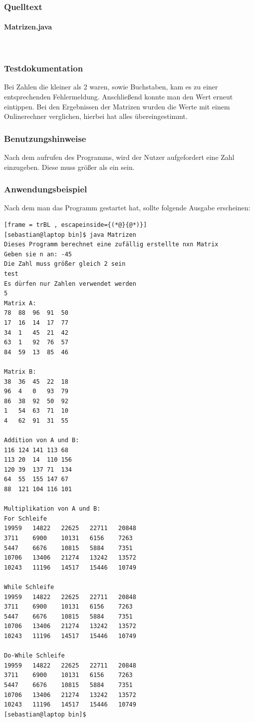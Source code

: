 \subsubsection{Quelltext}
\paragraph{Matrizen.java}\


\subsubsection{Testdokumentation}
Bei Zahlen die kleiner als 2 waren, sowie Buchstaben, kam es zu einer entsprechenden Fehlermeldung. Anschlie\ss end konnte man den Wert erneut eintippen.
Bei den Ergebnissen der Matrizen wurden die Werte mit einem Onlinerechner verglichen, hierbei hat
alles übereingestimmt.

\subsubsection{Benutzungshinweise}
Nach dem aufrufen des Programms, wird der Nutzer aufgefordert eine Zahl einzugeben.
Diese muss grö\ss er als ein sein.

\subsubsection{Anwendungsbeispiel}
Nach dem man das Programm gestartet hat, sollte folgende Ausgabe erscheinen:
\begin{lstlisting}[frame = trBL , escapeinside={(*@}{@*)}]
[sebastian@laptop bin]$ java Matrizen 
Dieses Programm berechnet eine zufällig erstellte nxn Matrix
Geben sie n an: -45
Die Zahl muss größer gleich 2 sein
test
Es dürfen nur Zahlen verwendet werden
5
Matrix A:
78	88	96	91	50	
17	16	14	17	77	
34	1	45	21	42	
63	1	92	76	57	
84	59	13	85	46	

Matrix B:
38	36	45	22	18	
96	4	0	93	79	
86	38	92	50	92	
1	54	63	71	10	
4	62	91	31	55	

Addition von A und B:
116	124	141	113	68	
113	20	14	110	156	
120	39	137	71	134	
64	55	155	147	67	
88	121	104	116	101	

Multiplikation von A und B:
For Schleife
19959	14822	22625	22711	20848	
3711	6900	10131	6156	7263	
5447	6676	10815	5884	7351	
10706	13406	21274	13242	13572	
10243	11196	14517	15446	10749	

While Schleife
19959	14822	22625	22711	20848	
3711	6900	10131	6156	7263	
5447	6676	10815	5884	7351	
10706	13406	21274	13242	13572	
10243	11196	14517	15446	10749	

Do-While Schleife
19959	14822	22625	22711	20848	
3711	6900	10131	6156	7263	
5447	6676	10815	5884	7351	
10706	13406	21274	13242	13572	
10243	11196	14517	15446	10749
[sebastian@laptop bin]$ 
\end{lstlisting}